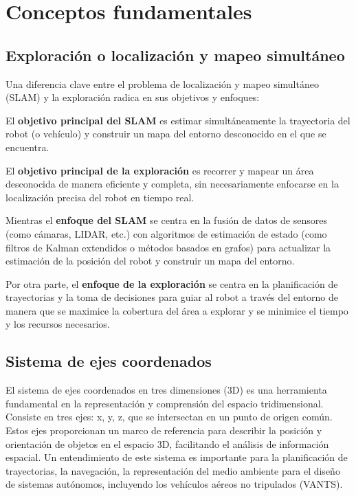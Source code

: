 \section{Conceptos fundamentales} \label{}

\subsection*{Exploración o localización y mapeo simultáneo}

Una diferencia clave entre el problema de localización y mapeo simultáneo (SLAM) y la exploración radica en sus objetivos y enfoques:

El \textbf{objetivo principal del SLAM} es estimar simultáneamente la trayectoria del robot (o vehículo) y construir un mapa del entorno desconocido en el que se encuentra.

El \textbf{objetivo principal de la exploración} es recorrer y mapear un área desconocida de manera eficiente y completa, sin necesariamente enfocarse en la localización precisa del robot en tiempo real.

Mientras el \textbf{enfoque del SLAM} se centra en la fusión de datos de sensores (como cámaras, LIDAR, etc.) con algoritmos de estimación de estado (como filtros de Kalman extendidos o métodos basados en grafos) para actualizar la estimación de la posición del robot y construir un mapa del entorno.

Por otra parte, el \textbf{enfoque de la exploración} se centra en la planificación de trayectorias y la toma de decisiones para guiar al robot a través del entorno de manera que se maximice la cobertura del área a explorar y se minimice el tiempo y los recursos necesarios.


\subsection*{Sistema de ejes coordenados}

El sistema de ejes coordenados en tres dimensiones (3D) es una herramienta fundamental en la representación y comprensión del espacio tridimensional. Consiste en tres ejes: x, y, z, que se intersectan en un punto de origen común. Estos ejes proporcionan un marco de referencia para describir la posición y orientación de objetos en el espacio 3D, facilitando el análisis de información espacial. Un entendimiento de este sistema es importante para la planificación de trayectorias, la navegación, la representación del medio ambiente para el diseño de sistemas autónomos, incluyendo los vehículos aéreos no tripulados (VANTS).


